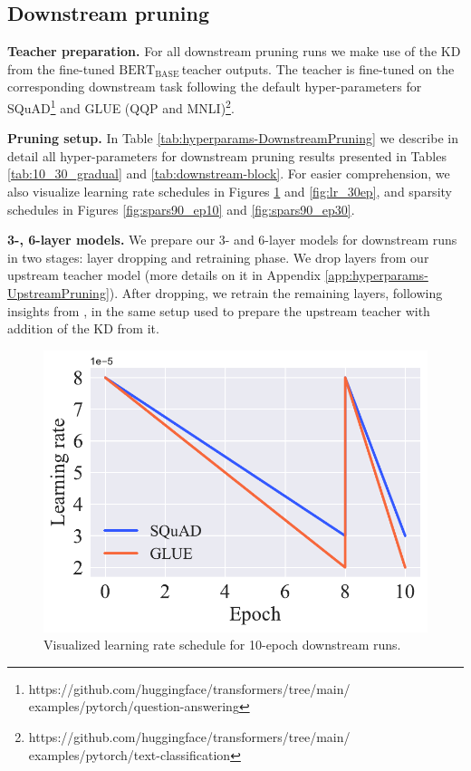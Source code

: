 \documentclass[11pt]{article}
\newcommand{\bert}{$\textrm{BERT}_{\textrm{BASE}}\,$}
\begin{document}
\subsection{Downstream pruning}
\label{app:hyperparams-DownstreamPruning}

\noindent\textbf{Teacher preparation.} For all downstream pruning runs we make use of the KD from the fine-tuned \bert teacher outputs. The teacher is fine-tuned on the corresponding downstream task following the default hyper-parameters for SQuAD\footnote{https://github.com/huggingface/transformers/tree/main/\\examples/pytorch/question-answering} and GLUE (QQP and MNLI)\footnote{https://github.com/huggingface/transformers/tree/main/\\examples/pytorch/text-classification}. 

\noindent\textbf{Pruning setup.} In Table \ref{tab:hyperparams-DownstreamPruning} we describe in detail all hyper-parameters for downstream pruning results presented in Tables \ref{tab:10_30_gradual} and \ref{tab:downstream-block}. For easier comprehension, we also visualize learning rate schedules in Figures \ref{fig:lr_10ep} and \ref{fig:lr_30ep}, and sparsity schedules in Figures \ref{fig:spars90_ep10} and \ref{fig:spars90_ep30}. 

\noindent\textbf{3-, 6-layer models.} We prepare our 3- and 6-layer models for downstream runs in two stages: layer dropping and retraining phase. We drop layers from our upstream teacher model (more details on it in Appendix \ref{app:hyperparams-UpstreamPruning}). After dropping, we retrain the remaining layers, following insights from \cite{Turc2019WellReadSL}, in the same setup used to prepare the upstream teacher with addition of the KD from it.

\begin{figure}[htb!]
    \centering
    \includegraphics[scale=0.5]{media/LR_10ep.pdf}
    \caption{Visualized learning rate schedule for 10-epoch downstream runs.}
    \label{fig:lr_10ep}
\end{figure}
\end{document}
